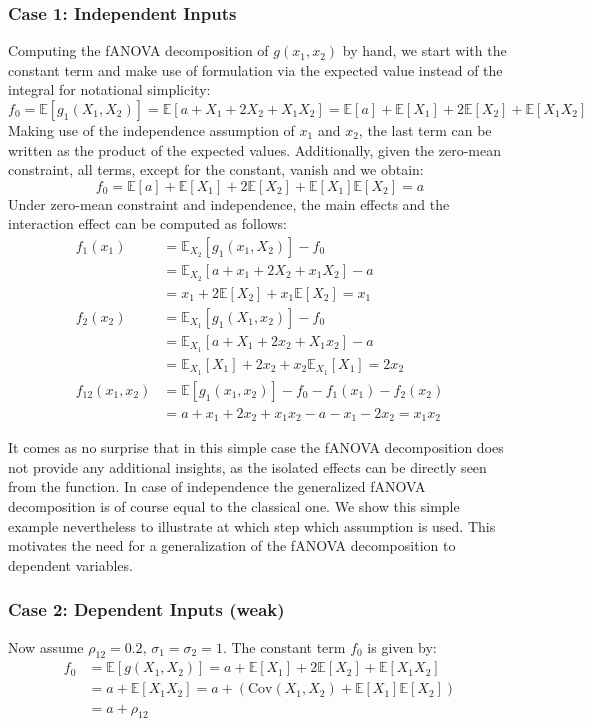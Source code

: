 \subsubsection*{Case 1: Independent Inputs}
Computing the fANOVA decomposition of $g(x_1, x_2)$ by hand, we start with the constant term and make use of formulation via the expected value instead of the integral for notational simplicity:
\[
f_0 = \mathbb{E}[g_{1}(X_1, X_2)] = \mathbb{E}[a + X_1 + 2X_2 + X_1X_2] = \mathbb{E}[a] + \mathbb{E}[X_1] + 2\mathbb{E}[X_2] + \mathbb{E}[X_1X_2]
\]
Making use of the independence assumption of $x_1$ and $x_2$, the last term can be written as the product of the expected values. Additionally, given the zero-mean constraint, all terms, except for the constant, vanish and we obtain:
\[
f_0 = \mathbb{E}[a] + \mathbb{E}[X_1] + 2\mathbb{E}[X_2] + \mathbb{E}[X_1]\mathbb{E}[X_2] = a
\]
Under zero-mean constraint and independence, the main effects and the interaction effect can be computed as follows:
\begin{align*}
f_1(x_1) &= \mathbb{E}_{X_2}[g_{1}(x_1, X_2)] - f_0 \\
&= \mathbb{E}_{X_2}[a + x_1 + 2X_2 + x_1X_2] - a \\
&= x_1 + 2\mathbb{E}[X_2] + x_1\mathbb{E}[X_2] = x_1\\
f_2(x_2) &= \mathbb{E}_{X_1}[g_{1}(X_1, x_2)] - f_0 \\
&= \mathbb{E}_{X_1}[a + X_1 + 2x_2 + X_1x_2] - a \\
&= \mathbb{E}_{X_1}[X_1] + 2x_2 + x_2\mathbb{E}_{X_1}[X_1] = 2x_2\\
f_{12}(x_1, x_2) &= \mathbb{E}[g_{1}(x_1, x_2)] - f_0 - f_1(x_1) - f_2(x_2) \\
&= a + x_1 + 2x_2 + x_1x_2 - a - x_1 - 2x_2 = x_1x_2
\end{align*}

It comes as no surprise that in this simple case the fANOVA decomposition does not provide any additional insights, as the isolated effects can be directly seen from the function.
In case of independence the generalized fANOVA decomposition is of course equal to the classical one.
We show this simple example nevertheless to illustrate at which step which assumption is used. This motivates the need for a generalization of the fANOVA decomposition to dependent variables.

\subsubsection*{Case 2: Dependent Inputs (weak)}
Now assume $\rho_{12} = 0.2,\, \sigma_1 = \sigma_2 = 1$. The constant term \( f_0 \) is given by:
\begin{align*}
f_0 &= \mathbb{E}[g(X_1, X_2)] 
= a + \mathbb{E}[X_1] + 2\mathbb{E}[X_2] + \mathbb{E}[X_1 X_2] \\
&= a + \mathbb{E}[X_1 X_2] 
= a + \left( \text{Cov}(X_1, X_2) + \mathbb{E}[X_1]\mathbb{E}[X_2] \right) \\
&= a + \rho_{12}
\end{align*}

